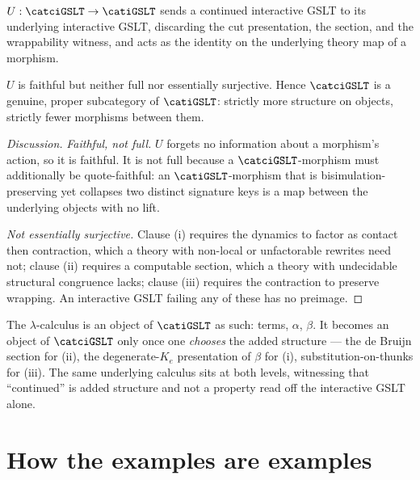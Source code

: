 \begin{definition}
$U : \catciGSLT \to \catiGSLT$ sends a continued interactive GSLT to its underlying interactive
GSLT, discarding the cut presentation, the section, and the wrappability witness, and
acts as the identity on the underlying theory map of a morphism.
\end{definition}

\begin{proposition}
\label{ob:prop:proper}
$U$ is faithful but neither full nor essentially surjective. Hence $\catciGSLT$ is a
genuine, proper subcategory of $\catiGSLT$: strictly more structure on objects, strictly
fewer morphisms between them.
\end{proposition}

\begin{proof}[Discussion]
\emph{Faithful, not full.} $U$ forgets no information about a morphism's action, so it
is faithful. It is not full because a $\catciGSLT$-morphism must additionally be
quote-faithful: an $\catiGSLT$-morphism that is bisimulation-preserving yet collapses two
distinct signature keys is a map between the underlying objects with no lift.

\emph{Not essentially surjective.} Clause (i) requires the dynamics to factor as contact
then contraction, which a theory with non-local or unfactorable rewrites need not;
clause (ii) requires a computable section, which a theory with undecidable structural
congruence lacks; clause (iii) requires the contraction to preserve wrapping. An
interactive GSLT failing any of these has no preimage.
\end{proof}

\begin{remark}
The $\lambda$-calculus is an object of $\catiGSLT$ as such: terms, $\alpha$, $\beta$. It
becomes an object of $\catciGSLT$ only once one \emph{chooses} the added structure --- the
de Bruijn section for (ii), the degenerate-$K_e$ presentation of $\beta$ for (i),
substitution-on-thunks for (iii). The same underlying calculus sits at both levels,
witnessing that ``continued'' is added structure and not a property read off the
interactive GSLT alone.
\end{remark}

\section{How the examples are examples}
\label{ob:subsec:table}

